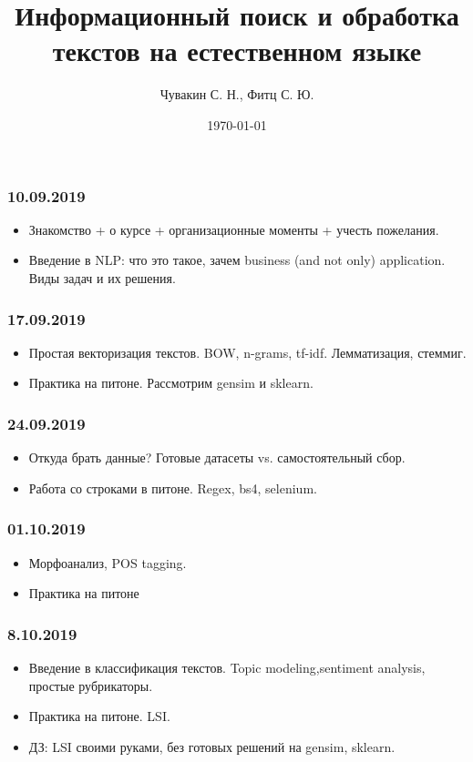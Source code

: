 \documentclass[a4paper,11pt]{article}
\author{Чувакин С. Н., Фитц С. Ю.}
\title{Информационный поиск и обработка текстов на естественном языке}
\date{\today}
\begin{document}
	
\maketitle
 
\subsubsection{10.09.2019}
\begin{itemize}
\item Знакомство + о курсе + организационные моменты + учесть пожелания.  
\item Введение в NLP: что это такое, зачем business (and not only) application. Виды задач и их решения. 
\end{itemize}

\subsubsection{17.09.2019}
\begin{itemize}
	\item Простая векторизация текстов. BOW, n-grams, tf-idf. Лемматизация, стеммиг. 
	\item Практика на питоне. Рассмотрим gensim и sklearn.  
\end{itemize}
\subsubsection{24.09.2019}
\begin{itemize}
	\item Откуда брать данные? Готовые датасеты vs. самостоятельный сбор.
	\item Работа со строками в питоне. Regex, bs4, selenium. 
\end{itemize}
\subsubsection{01.10.2019}
\begin{itemize}
	\item Морфоанализ,  POS tagging. 
	\item Практика на питоне 
\end{itemize}
\subsubsection{8.10.2019}
\begin{itemize}
	\item Введение в классификация текстов. Topic modeling,sentiment analysis, простые рубрикаторы.  
	\item Практика на питоне. LSI.
	\item ДЗ: LSI своими руками, без готовых решений на gensim, sklearn. 
\end{itemize}
\end{document}
